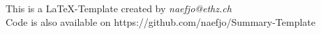 



\maketitle
\begin{center}
This is a \LaTeX-Template created by \textit{naefjo@ethz.ch}\\
Code is also available on https://github.com/naefjo/Summary-Template
\end{center}
\newpage

\begin{center}
    \begin{multicols*}{2}
        \tableofcontents
    \end{multicols*}
\end{center}

\begin{multicols*}{3}



\end{multicols*}     

